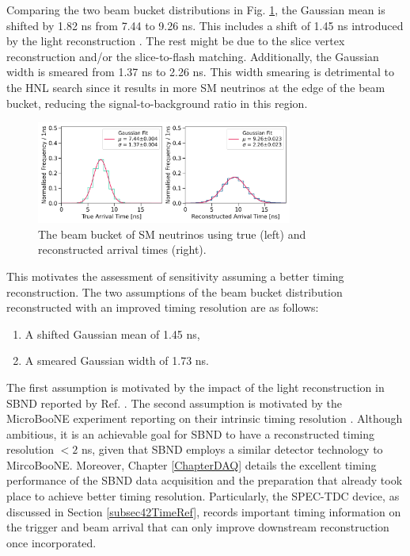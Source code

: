 
Comparing the two beam bucket distributions in Fig. \ref{fig:gaus_truth_reco}, the Gaussian mean is shifted by 1.82 ns from 7.44 to 9.26 ns.
This includes a shift of 1.45 ns introduced by the light reconstruction \cite{sbnd_pds_paper}.
The rest might be due to the slice vertex reconstruction and/or the slice-to-flash matching.      
Additionally, the Gaussian width is smeared from 1.37 ns to 2.26 ns. 
This width smearing is detrimental to the HNL search since it results in more SM neutrinos at the edge of the beam bucket, reducing the signal-to-background ratio in this region.                     

\begin{figure}[hb!]
    \centering
    \includegraphics[width=0.75\textwidth]{truth_reco_gaus.png}
    \caption[Beam Bucket Distributions Using True and Reconstructed Variables]{The beam bucket of SM neutrinos using true (left) and reconstructed arrival times (right).}
    \label{fig:gaus_truth_reco}
\end{figure}

This motivates the assessment of sensitivity assuming a better timing reconstruction.
The two assumptions of the beam bucket distribution reconstructed with an improved timing resolution are as follows:
\begin{enumerate}
    \item A shifted Gaussian mean of 1.45 ns,
    \item A smeared Gaussian width of 1.73 ns.
\end{enumerate}
The first assumption is motivated by the impact of the light reconstruction in SBND reported by Ref. \cite{sbnd_pds_paper}.
The second assumption is motivated by the MicroBooNE experiment reporting on their intrinsic timing resolution \cite{uboone_ns}.
Although ambitious, it is an achievable goal for SBND to have a reconstructed timing resolution $< 2$ ns, given that SBND employs a similar detector technology to MircoBooNE.
Moreover, Chapter \ref{ChapterDAQ} details the excellent timing performance of the SBND data acquisition and the preparation that already took place to achieve better timing resolution.
Particularly, the SPEC-TDC device, as discussed in Section \ref{subsec42TimeRef}, records important timing information on the trigger and beam arrival that can only improve downstream reconstruction once incorporated. 

